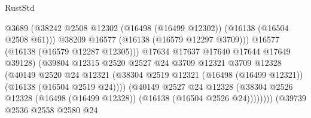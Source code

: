\begin{lexlean}{RustStd}
\begin{coremodule}
                                              @3689
                                              (@38242
                                                @2508
                                                @12302
                                                (@16498 (@16499 @12302))
                                                (@16138 (@16504 @2508 @61)))
                                              @38209
                                              @16577
                                              (@16138 (@16579 @12297 @3709)))
                                            @16577
                                            (@16138 (@16579 @12287 @12305)))
                                          @17634
                                          @17637
                                          @17640
                                          @17644
                                          @17649
                                          @39128)
                                        (@39804
                                          @12315
                                          @2520
                                          @2527
                                          @24
                                          @3709
                                          @12321
                                          @3709
                                          @12328
                                          (@40149
                                            @2520
                                            @24
                                            @12321
                                            (@38304
                                              @2519
                                              @12321
                                              (@16498 (@16499 @12321))
                                              (@16138 (@16504 @2519 @24))))
                                          (@40149
                                            @2527
                                            @24
                                            @12328
                                            (@38304
                                              @2526
                                              @12328
                                              (@16498 (@16499 @12328))
                                              (@16138 (@16504 @2526 @24))))))))
                                  (@39739
                                    @2536
                                    @2558
                                    @2580
                                    @24

\end{coremodule}
\end{lexlean}

